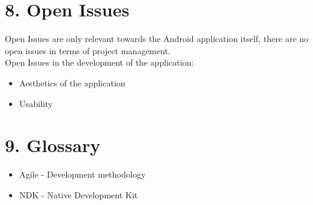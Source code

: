 \documentclass[29pt,a4paper]{moderncv}
\begin{document}
		\section*{8. Open Issues}
		Open Issues are only relevant towards the Android application itself, there are no open issues in terms of project management.\\
		Open Issues in the development of the application:
				\begin{itemize}
					\item Aesthetics of the application
					\item Usability
				\end{itemize}	
\newpage
		\section*{9. Glossary}
		\begin{itemize}
			\item Agile - Development methodology
			\item NDK - Native Development Kit
		\end{itemize}
\end{document}
